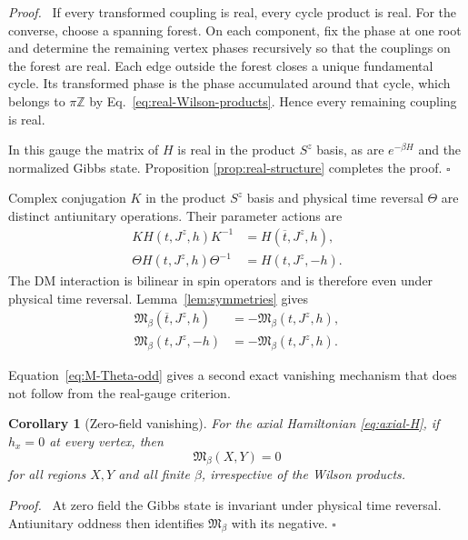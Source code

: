 \documentclass[11pt]{article}
\newcommand{\Mmod}{\mathfrak{M}}
\newtheorem{corollary}[theorem]{Corollary}
\newenvironment{proof}{\par\noindent\textit{Proof.}\ }%
{\unskip\nobreak\hfill\(\square\)\par}
\begin{document}
\begin{proof}
If every transformed coupling is real, every cycle product is real.  For the
converse, choose a spanning forest.  On each component, fix the phase at one
root and determine the remaining vertex phases recursively so that the
couplings on the forest are real.  Each edge outside the forest closes a
unique fundamental cycle.  Its transformed phase is the phase accumulated
around that cycle, which belongs to $\pi\mathbb Z$ by
Eq.~\eqref{eq:real-Wilson-products}.  Hence every remaining coupling is real.

In this gauge the matrix of $H$ is real in the product $S^z$ basis, as are
$e^{-\beta H}$ and the normalized Gibbs state.  Proposition
\ref{prop:real-structure} completes the proof.
\end{proof}

Complex conjugation $K$ in the product $S^z$ basis and physical time reversal
$\Theta$ are distinct antiunitary operations.  Their parameter actions are
\begin{align}
 K H(t,J^z,h)K^{-1}&=H(\overline t,J^z,h),
 \label{eq:K-action}\\
 \Theta H(t,J^z,h)\Theta^{-1}&=H(t,J^z,-h).
 \label{eq:Theta-action}
\end{align}
The DM interaction is bilinear in spin operators and is therefore even under
physical time reversal.  Lemma~\ref{lem:symmetries} gives
\begin{align}
 \Mmod_\beta(\overline t,J^z,h)
 &=-\Mmod_\beta(t,J^z,h),
 \label{eq:M-K-odd}\\
 \Mmod_\beta(t,J^z,-h)
 &=-\Mmod_\beta(t,J^z,h).
 \label{eq:M-Theta-odd}
\end{align}

Equation~\eqref{eq:M-Theta-odd} gives a second exact vanishing mechanism that
does not follow from the real-gauge criterion.

\begin{corollary}[Zero-field vanishing]
\label{cor:zero-field}
For the axial Hamiltonian \eqref{eq:axial-H}, if $h_x=0$ at every vertex,
then
\begin{equation}
 \Mmod_\beta(X,Y)=0
 \label{eq:zero-field-vanishing}
\end{equation}
for all regions $X,Y$ and all finite $\beta$, irrespective of the Wilson
products.
\end{corollary}

\begin{proof}
At zero field the Gibbs state is invariant under physical time reversal.
Antiunitary oddness then identifies $\Mmod_\beta$ with its negative.
\end{proof}
\end{document}
